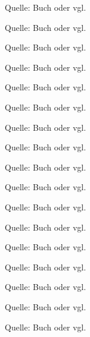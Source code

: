 Quelle: Buch oder
vgl.~\cite{loviscach:2018}

Quelle: Buch oder
vgl.~\cite{riesinger_mathe:2017}

Quelle: Buch oder
vgl.~\cite{riesinger_inf:2006}

Quelle: Buch oder
vgl.~\cite{schwichtenberg_ps:2017}

Quelle: Buch oder
vgl.~\cite{heiderich_techn_probleme-c:2016}

Quelle: Buch oder
vgl.~\cite{will_einfuehrung_c++:2014}

Quelle: Buch oder
vgl.~\cite{preisel_git:2017}

Quelle: Buch oder
vgl.~\cite{theis_einstieg_c++:2017}

Quelle: Buch oder
vgl.~\cite{theis_einstieg_c:2017}

Quelle: Buch oder
vgl.~\cite{theis_einstieg_php:2017}

Quelle: Buch oder
vgl.~\cite{theis_einstieg_python:2017}

Quelle: Buch oder
vgl.~\cite{gaicher_programmieren_c:2012}

Quelle: Buch oder
vgl.~\cite{plotzeneder_powerprojekte_c:2013}

Quelle: Buch oder
vgl.~\cite{kuhlee_forensik:2012}

Quelle: Buch oder
vgl.~\cite{erickson_hacking:2008}

Quelle: Buch oder
vgl.~\cite{ernesti_python:2015}

Quelle: Buch oder
vgl.~\cite{gaicher_avr_c:2015}
